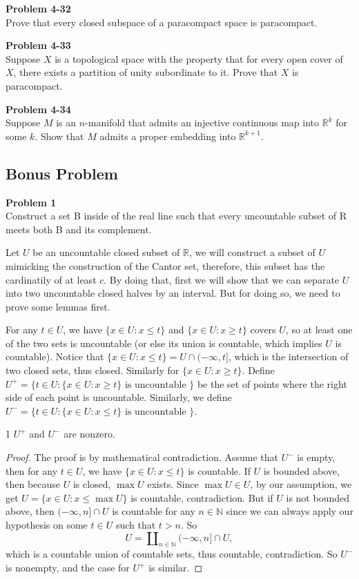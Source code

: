 \documentclass[12pt, a4paper]{article}
\theoremstyle{plain}
\newcommand{\N}{\mathbb{N}}
\newcommand{\R}{\mathbb{R}}
\newenvironment{problem}[2][Problem]
    { \begin{mdframed}[backgroundcolor=gray!20] \textbf{#1 #2} \\}
    {  \end{mdframed}}
\begin{document}
\begin{problem}{4-32}
    Prove that every closed subspace of a paracompact space is paracompact.
\end{problem}

\begin{problem}{4-33}
    Suppose $X$ is a topological space with the property that for every open cover of $X$, there exists a partition of unity subordinate to it. Prove that $X$ is paracompact.
\end{problem}

\begin{problem}{4-34}
    Suppose $M$ is an $n$-manifold that admits an injective continuous map into $\R^k$ for some $k$. Show that $M$ admits a proper embedding into $\R^{k+1}$.
\end{problem}

\subsection{Bonus Problem}
\begin{problem}{1}
Construct a set B inside of the real line such that every uncountable subset of R meets both B and its complement.
\end{problem}


Let $U$ be an uncountable closed subset of $\R$, we will construct a subset of $U$ mimicking the construction of the Cantor set, therefore, this subset has the cardinatily of at least $c$. By doing that, first we will show that we can separate $U$ into two uncountable closed halves by an interval. But for doing so, we need to prove some lemmas first.

For any $t\in U$, we have $\{x\in U:x\leq t\}$ and $\{x\in U:x\geq t\}$ covers $U$, so at least one of the two sets is uncountable (or else its union is countable, which implies $U$ is countable). Notice that $\{x\in U:x\leq t\}=U\cap (-\infty,t]$, which is the intersection of two closed sets, thus closed. Similarly for $\{x\in U:x\geq t\}$. Define $U^+=\{t\in U: \{x\in U:x\geq t\}\text{ is uncountable }\}$ be the set of points where the right side of each point is uncountable. Similarly, we define $U^-=\{t\in U: \{x\in U:x\leq t\}\text{ is uncountable }\}$.

\begin{lemma}{1}
$U^+$ and $U^-$ are nonzero.
\end{lemma}
	\begin{proof}
	The proof is by mathematical contradiction. Assume that $U^-$ is empty, then for any $t\in U$, we have $\{x\in U:x\leq t\}$ is countable. If $U$ is bounded above, then because $U$ is closed, $\max U$ exists. Since $\max U\in U$, by our assumption, we get $U = \{x\in U:x\leq \max U\}$ is countable, contradiction. But if $U$ is not bounded above, then $(-\infty,n]\cap U$ is countable for any $n\in \N$ since we can always apply our hypothesis on some $t\in U$ such that $t>n$. So
	\[
	U = \amalg_{n\in\N}(-\infty,n]\cap U,
	\] 
	which is a countable union of countable sets, thus countable, contradiction. So $U^-$ is nonempty, and the case for $U^+$ is similar.
	\end{proof}
	
\end{document}
